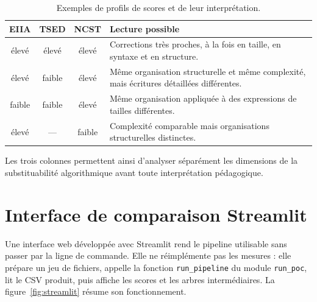 \documentclass[12pt,a4paper,oneside]{report}
\begin{document}
\begin{table}[htbp]
\centering
\small
\renewcommand{\arraystretch}{1.2}
\begin{tabularx}{\textwidth}{cccX}
\toprule
\textcolor{eiiacol}{\textbf{EIIA}} & \textcolor{tsedcol}{\textbf{TSED}} &
\textcolor{ncstcol}{\textbf{NCST}} & \textbf{Lecture possible} \\
\midrule
élevé & élevé & élevé & Corrections très proches, à la fois en taille, en syntaxe et en structure. \\
élevé & faible & élevé & Même organisation structurelle et même complexité, mais écritures détaillées différentes. \\
faible & faible & élevé & Même organisation appliquée à des expressions de tailles différentes. \\
élevé & --- & faible & Complexité comparable mais organisations structurelles distinctes. \\
\bottomrule
\end{tabularx}
\caption{Exemples de profils de scores et de leur interprétation.}
\label{tab:profils}
\end{table}

Les trois colonnes permettent ainsi d'analyser séparément les dimensions de la
substituabilité algorithmique avant toute interprétation pédagogique.

\section{Interface de comparaison Streamlit}

Une interface web développée avec Streamlit rend le pipeline utilisable sans
passer par la ligne de commande. Elle ne réimplémente pas les mesures : elle
prépare un jeu de fichiers, appelle la fonction \texttt{run\_pipeline} du
module \texttt{run\_poc}, lit le CSV produit, puis affiche les scores et les
arbres intermédiaires. La figure~\ref{fig:streamlit} résume son
fonctionnement.
\end{document}
